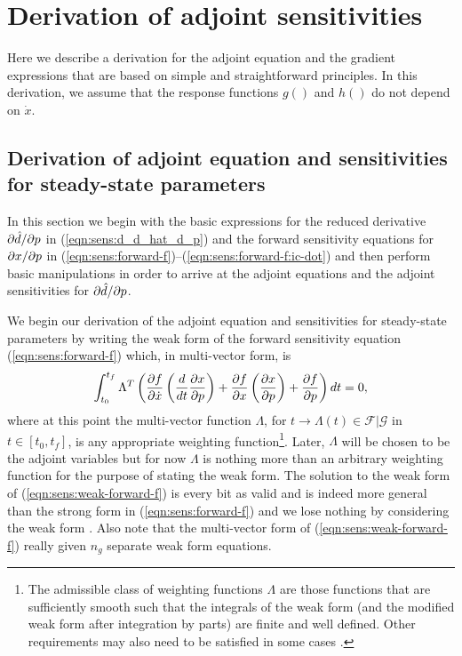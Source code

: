 \documentclass[pdf,ps2pdf,11pt]{SANDreport}
\begin{document}
\section{Derivation of adjoint sensitivities}

Here we describe a derivation for the adjoint equation and the gradient
expressions that are based on simple and straightforward principles.  In this
derivation, we assume that the response functions $g()$ and $h()$ do not
depend on $\dot{x}$.

\subsection{Derivation of adjoint equation and sensitivities for steady-state parameters}
\label{rythmos:app:adj-equ-derivation}

In this section we begin with the basic expressions for the reduced derivative
$\partial \hat{d} / \partial p$ in (\ref{eqn:sens:d_d_hat_d_p}) and the forward sensitivity
equations for $\partial x / \partial p$ in
(\ref{eqn:sens:forward-f})--(\ref{eqn:sens:forward-f:ic-dot}) and then perform
basic manipulations in order to arrive at the adjoint equations and the
adjoint sensitivities for $\partial \hat{d} / \partial p$.

We begin our derivation of the adjoint equation and sensitivities for
steady-state parameters by writing the weak form of the forward sensitivity
equation (\ref{eqn:sens:forward-f}) which, in multi-vector form, is
%
\begin{equation}
\int_{t_0}^{t_f} \Lambda^T \left(
\displaystyle{\frac{\partial f}{\partial \dot{x}}} \left(\frac{d}{dt} \displaystyle{\frac{\partial x}{\partial p}} \right)
+ \displaystyle{\frac{\partial f}{\partial x}} \left(\displaystyle{\frac{\partial x}{\partial p}}\right)
+ \displaystyle{\frac{\partial f}{\partial p}}
\right) dt = 0,
\label{eqn:sens:weak-forward-f}
\end{equation}
%
where at this point the multi-vector function $\Lambda$, for
$t\rightarrow\Lambda(t)\in\mathcal{F}|\mathcal{G}$ in $t\in[t_0,t_f]$, is any
appropriate weighting function\footnote{The admissible class of weighting
functions $\Lambda$ are those functions that are sufficiently smooth such that
the integrals of the weak form (and the modified weak form after integration
by parts) are finite and well defined.  Other requirements may also need to be
satisfied in some cases {}\cite{BeckerCareyOden-FE}.}.  Later, $\Lambda$ will
be chosen to be the adjoint variables but for now $\Lambda$ is nothing more
than an arbitrary weighting function for the purpose of stating the weak form.
The solution to the weak form of (\ref{eqn:sens:weak-forward-f}) is every bit
as valid and is indeed more general than the strong form in
(\ref{eqn:sens:forward-f}) and we lose nothing by considering the weak form
{}\cite{BeckerCareyOden-FE}.  Also note that the multi-vector form of
(\ref{eqn:sens:weak-forward-f}) really given $n_g$ separate weak form
equations.
\end{document}

